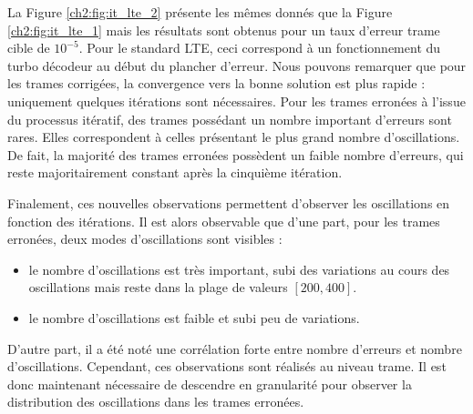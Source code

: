 La Figure \ref{ch2:fig:it_lte_2} présente les mêmes donnés que la Figure \ref{ch2:fig:it_lte_1} mais les résultats sont
obtenus pour un taux d'erreur trame cible de $10^{-5}$. Pour le standard LTE, ceci correspond à un fonctionnement du 
turbo décodeur au début du plancher d'erreur. Nous pouvons remarquer que pour les trames corrigées, la convergence vers 
la bonne solution est plus rapide : uniquement quelques itérations sont nécessaires. Pour les trames erronées à l'issue 
du processus itératif, des trames possédant un nombre important d'erreurs sont rares. Elles correspondent à celles 
présentant le plus grand nombre d'oscillations. De fait, la majorité des trames erronées possèdent un faible nombre 
d'erreurs, qui reste majoritairement constant après la cinquième itération.

Finalement, ces nouvelles observations permettent d'observer les oscillations en fonction des itérations. Il est alors 
observable que d'une part, pour les trames erronées, deux \og modes \fg d'oscillations sont visibles :
\begin{itemize}
	\item le nombre d'oscillations est très important, subi des variations au cours des oscillations mais reste dans la plage de valeurs $[200,400]$.
	\item le nombre d'oscillations est faible et subi peu de variations.
\end{itemize}

D'autre part, il a été noté une corrélation forte entre nombre d'erreurs et nombre d'oscillations. Cependant, ces 
observations sont réalisés au niveau trame. Il est donc maintenant nécessaire de descendre en granularité pour observer 
la distribution des oscillations dans les trames erronées.

